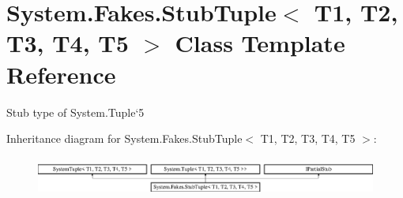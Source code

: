 \hypertarget{class_system_1_1_fakes_1_1_stub_tuple_3_01_t1_00_01_t2_00_01_t3_00_01_t4_00_01_t5_01_4}{\section{System.\-Fakes.\-Stub\-Tuple$<$ T1, T2, T3, T4, T5 $>$ Class Template Reference}
\label{class_system_1_1_fakes_1_1_stub_tuple_3_01_t1_00_01_t2_00_01_t3_00_01_t4_00_01_t5_01_4}
}


Stub type of System.\-Tuple`5 


Inheritance diagram for System.\-Fakes.\-Stub\-Tuple$<$ T1, T2, T3, T4, T5 $>$\-:\begin{figure}[H]
\begin{center}
\leavevmode
\includegraphics[height=1.296296cm]{class_system_1_1_fakes_1_1_stub_tuple_3_01_t1_00_01_t2_00_01_t3_00_01_t4_00_01_t5_01_4}
\end{center}
\end{figure}
